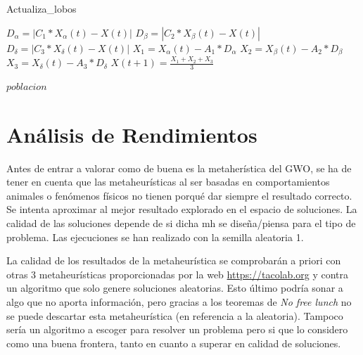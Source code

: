 \documentclass[a4paper, 12.5pt]{report}
\begin{document}
\begin{algorithm}[H]
    \caption{Actualiza\_lobos}\label{alg:AW}
    \begin{algorithmic}[1]

        \State $D_\alpha=|C_1*X_\alpha(t)-X(t)| $
        \State $D_\beta=|C_2*X_\beta(t)-X(t)| $
        \State $D_\delta=|C_3*X_\delta(t)-X(t)| $
        \State $X_1=X_\alpha(t)-A_1*D_\alpha$
        \State $X_2=X_\beta(t)-A_2*D_\beta$
        \State $X_3=X_\delta(t)-A_3*D_\delta$
        \State $X(t+1)=\frac{X_1+X_2+X_3}{3}$ 

        \EndFor

        \Return $poblacion$
        \EndFunction


    \end{algorithmic}
\end{algorithm}









\section{Análisis de Rendimientos}

Antes de entrar a valorar como de buena es la metaherística del GWO, se ha de tener en cuenta que las metaheurísticas al ser basadas en comportamientos animales o fenómenos físicos no tienen porqué dar siempre el resultado correcto.
Se intenta aproximar al mejor resultado explorado en el espacio de soluciones.     La calidad de las soluciones depende de si dicha mh se diseña/piensa para el tipo de problema. Las ejecuciones se han realizado con la semilla aleatoria 1.

La calidad de los resultados de la metaheurística se comprobarán a priori con otras 3 metaheurísticas proporcionadas por la web \url{https://tacolab.org} y contra un algoritmo que solo genere soluciones aleatorias.     Esto último podría sonar a algo que no aporta información, pero gracias a los teoremas de \textit{No free lunch} no se puede descartar esta metaheurística (en referencia a la aleatoria). Tampoco sería un algoritmo a escoger para resolver un problema pero si que lo considero como una buena frontera, tanto en cuanto a superar en calidad de soluciones.
\end{document}
